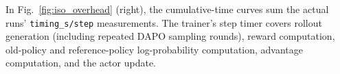 \documentclass[11pt, a4paper]{utda}
\theoremstyle{plain}
\theoremstyle{definition}
\theoremstyle{remark}
\begin{document}
In Fig.~\ref{fig:iso_overhead} (right), the cumulative-time curves sum the actual runs'
\texttt{timing\_s/step} measurements.
The trainer's step timer covers rollout generation
(including repeated DAPO sampling rounds), reward computation,
old-policy and reference-policy log-probability computation,
advantage computation, and the actor update.











% 
\end{document}
